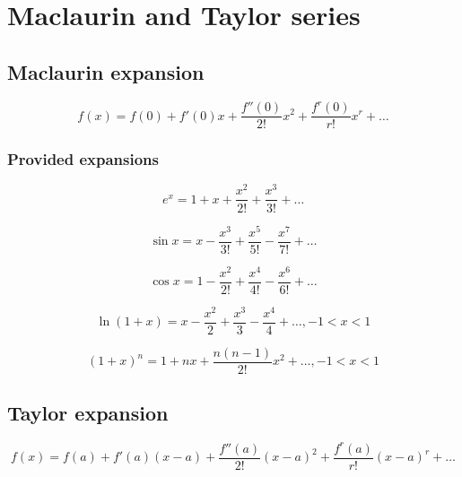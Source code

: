 \documentclass[a4paper,9pt]{scrartcl}
\begin{document}
    \section{Maclaurin and Taylor series}

    \subsection{Maclaurin expansion}

    \begin{displaymath}
        f(x) = f(0) + f'(0)x + \frac{f''(0)}{2!}x^2 + \frac{f^{r}(0)}{r!}x^r + \dots
    \end{displaymath}

    \subsubsection{Provided expansions}
    \begin{displaymath}
        e^x = 1 + x + \frac{x^2}{2!} + \frac{x^3}{3!} + \dots
    \end{displaymath}

    \begin{displaymath}
        \sin{x} = x - \frac{x^3}{3!} + \frac{x^5}{5!} - \frac{x^7}{7!} + \dots
    \end{displaymath}

    \begin{displaymath}
        \cos{x} = 1 - \frac{x^2}{2!} + \frac{x^4}{4!} - \frac{x^6}{6!} + \dots
    \end{displaymath}

    \begin{displaymath}
        \ln{(1+x)} = x - \frac{x^2}{2} + \frac{x^3}{3} - \frac{x^4}{4} + \dots, -1 < x < 1
    \end{displaymath}

    \begin{displaymath}
        (1+x)^n = 1+nx+\frac{n(n-1)}{2!}x^2 + \dots, -1 < x < 1
    \end{displaymath}

    \subsection{Taylor expansion}

    \begin{displaymath}
        f(x) = f(a) + f'(a)(x - a) + \frac{f''(a)}{2!}(x - a)^2 + \frac{f^{r}(a)}{r!}(x - a)^r + \dots
    \end{displaymath}
\end{document}
